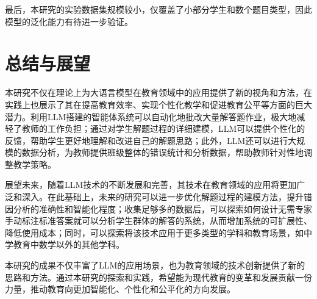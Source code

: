 最后，本研究的实验数据集规模较小，仅覆盖了小部分学生和数个题目类型，因此模型的泛化能力有待进一步验证。

\section{总结与展望}

本研究不仅在理论上为大语言模型在教育领域中的应用提供了新的视角和方法，在实践上也展示了其在提高教育效率、实现个性化教学和促进教育公平等方面的巨大潜力。利用LLM搭建的智能体系统可以自动化地批改大量解答题作业，极大地减轻了教师的工作负担；通过对学生解题过程的详细建模，LLM可以提供个性化的反馈，帮助学生更好地理解和改进自己的解题思路；此外，LLM还可以进行大规模的数据分析，为教师提供班级整体的错误统计和分析数据，帮助教师针对性地调整教学策略。

展望未来，随着LLM技术的不断发展和完善，其技术在教育领域的应用将更加广泛和深入。在此基础上，未来的研究可以进一步优化解题过程的建模方法，提升错因分析的准确性和智能化程度；收集足够多的数据后，可以探索如何设计无需专家手动标注标准答案就可以分析学生群体的解答的系统，从而增加系统的可扩展性、降低使用成本；同时，可以探索将该技术应用于更多类型的学科和教育场景，如中学教育中数学以外的其他学科。

本研究的成果不仅丰富了LLM的应用场景，也为教育领域的技术创新提供了新的思路和方法​​。通过本研究的探索和实践，希望能为现代教育的变革和发展贡献一份力量，推动教育向更加智能化、个性化和公平化的方向发展。